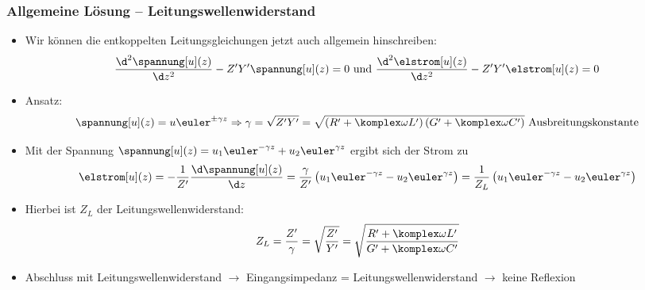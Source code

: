   \begin{frame}
    \frametitle{Allgemeine Lösung -- Leitungswellenwiderstand}
      \begin{itemize}[<+->]
      \item Wir können die entkoppelten Leitungsgleichungen jetzt auch allgemein hinschreiben:
    \begin{equation*}
      \frac{\d^2 \spannung[u](z)}{\d z^2} -  Z^\prime Y^\prime \spannung[u](z) = 0 \text{ und } \frac{\d^2 \elstrom[u](z)}{\d z^2} -  Z^\prime Y^\prime \elstrom[u](z) = 0
    \end{equation*}
  \item Ansatz:
    \begin{equation*}
      \spannung[u](z) = u \euler^{\pm\gamma z} \Rightarrow \gamma = \sqrt{Z^\prime Y^\prime} = \sqrt{\left(R^\prime + \komplex\omega L^\prime\right) \left(G^\prime + \komplex\omega C^\prime\right)} \text{ Ausbreitungskonstante}
    \end{equation*}
  \item Mit der Spannung \(\spannung[u](z) = u_1 \euler^{-\gamma z} + u_2 \euler^{\gamma z}\) ergibt sich der Strom zu
    \begin{equation*}
      \elstrom[u](z) = - \frac{1}{Z^\prime} \frac{\d \spannung[u](z)}{\d z} = \frac{\gamma}{Z^\prime} \left( u_1 \euler^{-\gamma z} - u_2 \euler^{\gamma z}\right) = \frac{1}{Z_L} \left( u_1 \euler^{-\gamma z} - u_2 \euler^{\gamma z}\right)  
    \end{equation*}
  \item Hierbei ist \(Z_L\) der \alert{Leitungswellenwiderstand}:
    \begin{equation*}
      Z_L= \frac{Z^\prime}{\gamma} = \sqrt{\frac{Z^\prime}{Y^\prime}} = \sqrt{\frac{R^\prime + \komplex\omega L^\prime}{G^\prime + \komplex\omega C^\prime}} 
    \end{equation*}
    \item Abschluss mit Leitungswellenwiderstand \(\to\) Eingangsimpedanz = Leitungswellenwiderstand \(\to\) \alert{keine Reflexion}
    \end{itemize}
    \ 
  \end{frame}
  

